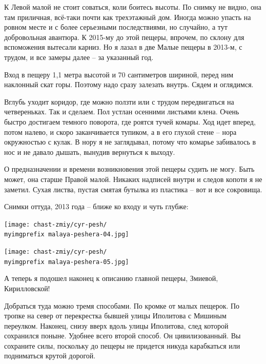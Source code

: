 К Левой малой не стоит соваться, коли боитесь высоты. По снимку не видно, она там приличная, всё-таки почти как трехэтажный дом. Иногда можно упасть на ровном месте и с более серьезными последствиями, но случайно, а тут добровольная авантюра. К 2015-му до этой пещеры, впрочем, по склону для вспоможения вытесали карниз. Но я лазал в две Малые пещеры в 2013-м, с трудом, и все замеры далее – за указанный год.

Вход в пещеру 1,1 метра высотой и 70 сантиметров шириной, перед ним наклонный скат горы. Поэтому надо сразу залезать внутрь. Сядем и оглядимся.

Вглубь уходит коридор, где можно ползти или с трудом передвигаться на четвереньках. Так и сделаем. Пол устлан осенними листьями клена. Очень быстро достигаем темного поворота, где роятся тучей комары. Ход идет вперед, потом налево, и скоро заканчивается тупиком, а в его глухой стене – нора окружностью с кулак. В нору я не заглядывал, потому что комарье забивалось в нос и не давало дышать, вынудив вернуться к выходу.

О предназначении и времени возникновения этой пещеры судить не могу. Быть может, она старше Правой малой. Никаких надписей внутри и следов копоти я не заметил. Сухая листва, пустая смятая бутылка из пластика – вот и все сокровища.

Снимки оттуда, 2013 года – ближе ко входу и чуть глубже:

\vspace*{\fill}
\begin{center}
\texttt{[image: chast-zmiy/cyr-pesh/\\myimgprefix malaya-peshera-04.jpg]}
\end{center}
\vspace*{\fill}
\newpage

\begin{center}
\texttt{[image: chast-zmiy/cyr-pesh/\\myimgprefix malaya-peshera-05.jpg]}
\end{center}

А теперь я подошел наконец к описанию главной пещеры, Змиевой, Кирилловской!

Добраться туда можно тремя способами. По кромке от малых пещерок. По тропке на север от перекрестка бывшей улицы Иполитова с Мишиным переулком. Наконец, снизу вверх вдоль улицы Иполитова, след которой сохранился поныне. Удобнее всего второй способ. Он цивилизованный. Вы сохраните силы, поскольку до пещеры не придется никуда карабкаться или подниматься крутой дорогой.

